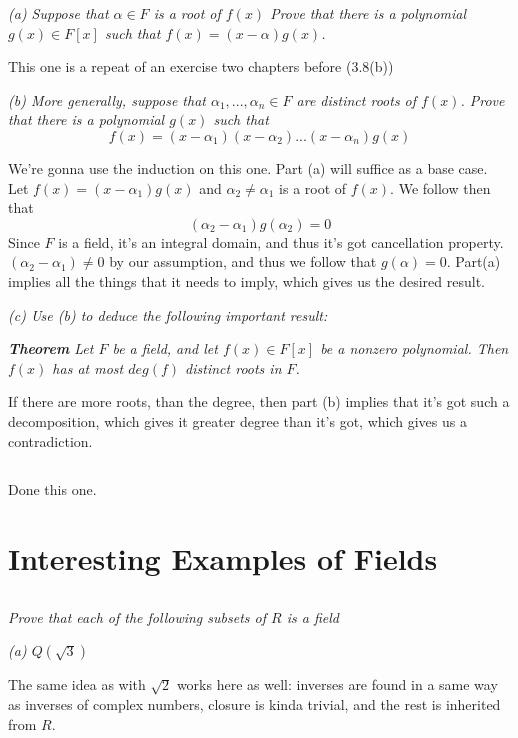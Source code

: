 \documentclass[11pt,oneside,titlepage]{book}
\begin{document}
\textit{(a) Suppose that $\alpha \in F$ is a root of $f(x)$ Prove that
there is a polynomial $g(x) \in F[x]$ such that $f(x) = (x - \alpha)
g(x)$.}

This one is a repeat of an exercise two chapters before (3.8(b))

\textit{(b) More generally, suppose that $\alpha_1, ..., \alpha_n \in
F$ are distinct roots of $f(x)$. Prove that there is a polynomial
$g(x)$ such that
  $$f(x) = (x - \alpha_1) (x - \alpha_2) ... (x - \alpha_n) g(x)$$
}

We're gonna use the induction on this one. Part (a) will suffice as a
base case. Let $f(x) = (x - \alpha_1) g(x)$ and $\alpha_2 \neq
\alpha_1$ is a root of $f(x)$. We follow then that
$$(\alpha_2 - \alpha_1) g(\alpha_2) = 0$$
Since $F$ is a field, it's an integral domain, and thus it's got
cancellation property.  $(\alpha_2 - \alpha_1) \neq 0$ by our
assumption, and thus we follow that $g(\alpha) = 0$.  Part(a) implies
all the things that it needs to imply, which gives us the desired
result.

\textit{(c) Use (b) to deduce the following important result:}

\textit{\textbf{Theorem} Let $F$ be a field, and let $f(x) \in F[x]$
be a nonzero polynomial.  Then $f(x)$ has at most $deg(f)$ distinct
roots in $F$.}

If there are more roots, than the degree, then part (b) implies that
it's got such a decomposition, which gives it greater degree than it's
got, which gives us a contradiction.

\subsection{}

Done this one.

\section{Interesting Examples of Fields}

\subsection{}

\textit{Prove that each of the following subsets of $R$ is a field}

\textit{(a) $Q(\sqrt{3})$}

The same idea as with $\sqrt{2}$ works here as well: inverses are
found in a same way as inverses of complex numbers, closure is kinda
trivial, and the rest is inherited from $R$.
\end{document}
